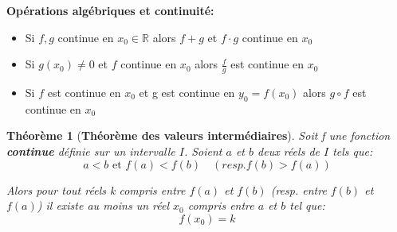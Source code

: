 \documentclass[a4paper]{article}
\theoremstyle{break}
\newtheorem{theo}{Théorème}[section]
\begin{document}
\vspace{1\baselineskip}

\textbf{Opérations algébriques et continuité:}

\begin{itemize}[label =$\bullet$, leftmargin =2cm]
\item Si $f,g$ continue en $x_0 \in \mathbb{R}$ alors $f+g$ et $f
  \cdot g$ continue en $x_0$ 
\item Si $g(x_0) \neq 0$ et $f$ continue en $x_0$ alors $\frac{f}{g}$
  est continue en $x_0$
\item Si $f$ est continue en $x_0$ et g est continue en $y_0 = f(x_0)$
  alors $g \circ f$ est continue en $x_0$
\end{itemize}

\begin{theo}[\textbf{Théorème des valeurs intermédiaires}]
  
  Soit f une fonction \textbf{continue} définie sur un intervalle $I$. Soient $a$
  et $b$ deux réels de $I$ tels que:
  \[
    a < b \text{ et } f(a)<f(b) \quad (resp. f(b) > f(a))
  \]

  Alors pour tout réels k compris entre $f(a)$ et $f(b)$ (resp. entre
  $f(b)$ et $f(a)$) il existe au moins un réel $x_0$ compris entre $a$ et $b$ tel que:
  \[
    f(x_0) = k
  \]
 
\end{theo}
\end{document}
